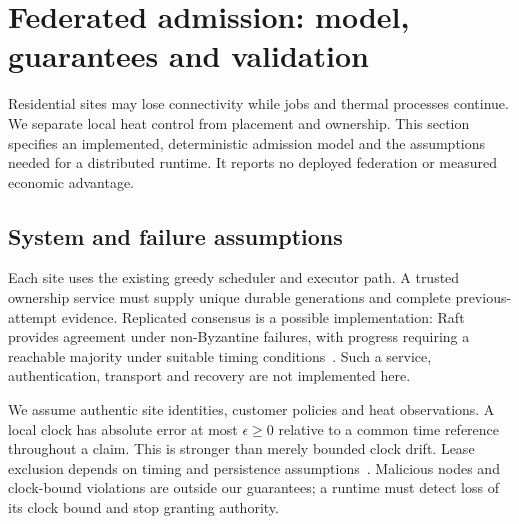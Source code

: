 \section{Federated admission: model, guarantees and validation}
\label{sec:federation}

Residential sites may lose connectivity while jobs and thermal processes continue. We separate
local heat control from placement and ownership. This section specifies an implemented,
deterministic admission model and the assumptions needed for a distributed runtime. It reports
no deployed federation or measured economic advantage.

\subsection{System and failure assumptions}
Each site uses the existing greedy scheduler and executor path. A trusted ownership service must
supply unique durable generations and complete previous-attempt evidence. Replicated consensus
is a possible implementation: Raft provides agreement under non-Byzantine failures, with progress
requiring a reachable majority under suitable timing conditions~\cite{ongaro2014raft}. Such a
service, authentication, transport and recovery are not implemented here.

We assume authentic site identities, customer policies and heat observations. A local clock has
absolute error at most $\epsilon\ge0$ relative to a common time reference throughout a claim.
This is stronger than merely bounded clock drift. Lease exclusion depends on timing and
persistence assumptions~\cite{gray1989leases}. Malicious nodes and clock-bound violations are
outside our guarantees; a runtime must detect loss of its clock bound and stop granting authority.

